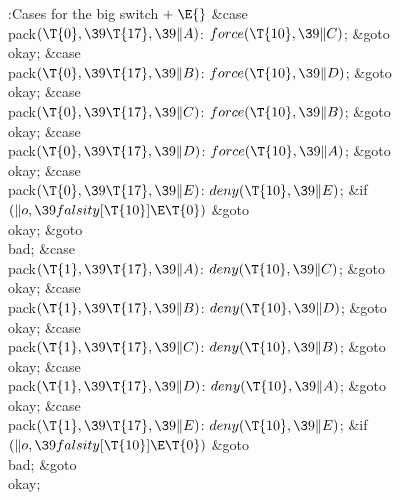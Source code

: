 \Y\B\4:Cases for the big switch\X${}\mathrel+\E{}$\6
\4\&{case} \\{pack}${}(\T{0},\39\T{17},\39\|A){}$:\5
${}\\{force}(\T{10},\39\|C){}$;\5
\&{goto} \\{okay};\6
\4\&{case} \\{pack}${}(\T{0},\39\T{17},\39\|B){}$:\5
${}\\{force}(\T{10},\39\|D){}$;\5
\&{goto} \\{okay};\6
\4\&{case} \\{pack}${}(\T{0},\39\T{17},\39\|C){}$:\5
${}\\{force}(\T{10},\39\|B){}$;\5
\&{goto} \\{okay};\6
\4\&{case} \\{pack}${}(\T{0},\39\T{17},\39\|D){}$:\5
${}\\{force}(\T{10},\39\|A){}$;\5
\&{goto} \\{okay};\6
\4\&{case} \\{pack}${}(\T{0},\39\T{17},\39\|E){}$:\5
${}\\{deny}(\T{10},\39\|E){}$;\5
\&{if} ${}(\|o,\39\\{falsity}[\T{10}]\E\T{0}){}$\1\5
\&{goto} \\{okay};\5
\2\&{goto} \\{bad};\6
\4\&{case} \\{pack}${}(\T{1},\39\T{17},\39\|A){}$:\5
${}\\{deny}(\T{10},\39\|C){}$;\5
\&{goto} \\{okay};\6
\4\&{case} \\{pack}${}(\T{1},\39\T{17},\39\|B){}$:\5
${}\\{deny}(\T{10},\39\|D){}$;\5
\&{goto} \\{okay};\6
\4\&{case} \\{pack}${}(\T{1},\39\T{17},\39\|C){}$:\5
${}\\{deny}(\T{10},\39\|B){}$;\5
\&{goto} \\{okay};\6
\4\&{case} \\{pack}${}(\T{1},\39\T{17},\39\|D){}$:\5
${}\\{deny}(\T{10},\39\|A){}$;\5
\&{goto} \\{okay};\6
\4\&{case} \\{pack}${}(\T{1},\39\T{17},\39\|E){}$:\5
${}\\{deny}(\T{10},\39\|E){}$;\5
\&{if} ${}(\|o,\39\\{falsity}[\T{10}]\E\T{0}){}$\1\5
\&{goto} \\{bad};\5
\2\&{goto} \\{okay};\par
\fi

